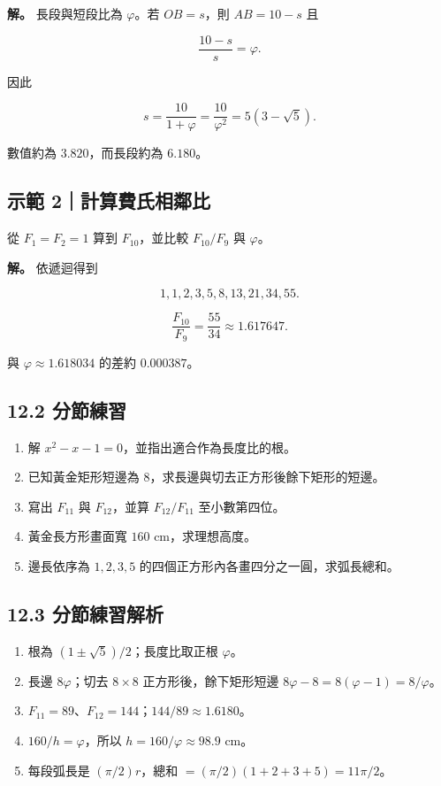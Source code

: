 \documentclass[11pt,a4paper]{article}
\providecommand{\tightlist}{%
  \setlength{\itemsep}{0pt}\setlength{\parskip}{0pt}}
\begin{document}
\textbf{解。} 長段與短段比為 \(\varphi\)。若 \(OB=s\)，則 \(AB=10-s\) 且

\[
\frac{10-s}{s}=\varphi.
\]

因此

\[
s=\frac{10}{1+\varphi}=\frac{10}{\varphi^2}=5(3-\sqrt5).
\]

數值約為 \(3.820\)，而長段約為 \(6.180\)。

\subsection{示範 2｜計算費氏相鄰比}\label{ux793aux7bc4-2ux8a08ux7b97ux8cbbux6c0fux76f8ux9130ux6bd4}

從 \(F_1=F_2=1\) 算到 \(F_{10}\)，並比較 \(F_{10}/F_9\) 與 \(\varphi\)。

\textbf{解。} 依遞迴得到

\[
1,1,2,3,5,8,13,21,34,55.
\]

\[
\frac{F_{10}}{F_9}=\frac{55}{34}\approx1.617647.
\]

與 \(\varphi\approx1.618034\) 的差約 \(0.000387\)。

\subsection{12.2 分節練習}\label{ux5206ux7bc0ux7df4ux7fd2-11}

\begin{enumerate}
\def\labelenumi{\arabic{enumi}.}
\tightlist
\item
  解 \(x^2-x-1=0\)，並指出適合作為長度比的根。
\item
  已知黃金矩形短邊為 \(8\)，求長邊與切去正方形後餘下矩形的短邊。
\item
  寫出 \(F_{11}\) 與 \(F_{12}\)，並算 \(F_{12}/F_{11}\) 至小數第四位。
\item
  黃金長方形畫面寬 \(160\text{ cm}\)，求理想高度。
\item
  邊長依序為 \(1,2,3,5\) 的四個正方形內各畫四分之一圓，求弧長總和。
\end{enumerate}

\subsection{12.3 分節練習解析}\label{ux5206ux7bc0ux7df4ux7fd2ux89e3ux6790-11}

\begin{enumerate}
\def\labelenumi{\arabic{enumi}.}
\tightlist
\item
  根為 \((1\pm\sqrt5)/2\)；長度比取正根 \(\varphi\)。
\item
  長邊 \(8\varphi\)；切去 \(8\times8\) 正方形後，餘下矩形短邊 \(8\varphi-8=8(\varphi-1)=8/\varphi\)。
\item
  \(F_{11}=89\)、\(F_{12}=144\)；\(144/89\approx1.6180\)。
\item
  \(160/h=\varphi\)，所以 \(h=160/\varphi\approx98.9\text{ cm}\)。
\item
  每段弧長是 \((\pi/2)r\)，總和 \(=(\pi/2)(1+2+3+5)=11\pi/2\)。
\end{enumerate}
\end{document}
